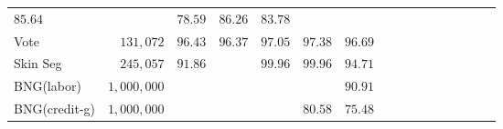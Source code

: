 \begin{table}[!t]
\begin{tabular}{lrrrrrrrrrrrrrrr}
		$ 85.64 $  & \textemdash &  $ 78.59 $  &  $ \mathbf{86.26} $  &  $ 83.78 $  \\
		\multirow{1}{*}{Vote} & \multirow{1}{*}{ $ 131,072 $ }  &
		$ 96.43 $  &  $ 96.37 $  &  $ 97.05 $  &  $ \mathbf{97.38} $  &  $ 96.69 $  \\
		\multirow{1}{*}{Skin Seg} & \multirow{1}{*}{ $ 245,057 $ }  &
		$ 91.86 $  & \textemdash &  $ \mathbf{99.96} $  &  $ \mathbf{99.96} $  &  $ 94.71 $  \\
		\multirow{1}{*}{BNG(labor)} & \multirow{1}{*}{ $ 1,000,000 $ }  &
		\textemdash & \textemdash & \textemdash & \textemdash &  $ \mathbf{90.91} $  \\
		\multirow{1}{*}{BNG(credit-g)} & \multirow{1}{*}{ $ 1,000,000 $ }  &
		\textemdash & \textemdash & \textemdash &  $ \mathbf{80.58} $  &  $ 75.48 $  \\
		\bottomrule
		
		
		
	\end{tabular}
	
\end{table}


